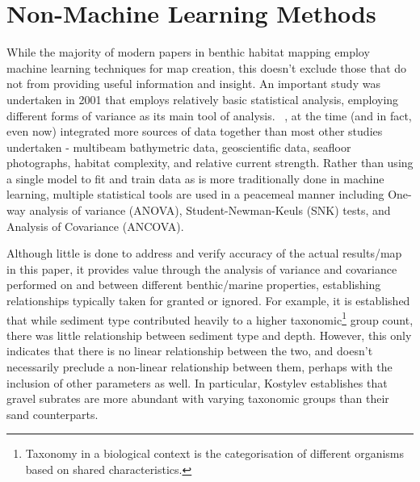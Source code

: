 \section{Non-Machine Learning Methods}
 While the majority of modern papers in benthic habitat mapping employ machine learning techniques for map creation, this doesn't exclude those that do not from providing useful information and insight. An important study was undertaken in 2001 that employs relatively basic statistical analysis, employing different forms of variance as its main tool of analysis. ~\citep{kostylev01}, at the time (and in fact, even now) integrated more sources of data together than most other studies undertaken - multibeam bathymetric data, geoscientific data, seafloor photographs, habitat complexity, and relative current strength. Rather than using a single model to fit and train data as is more traditionally done in machine learning, multiple statistical tools are used in a peacemeal manner including One-way analysis of variance (ANOVA), Student-Newman-Keuls (SNK) tests, and Analysis of Covariance (ANCOVA). 

Although little is done to address and verify accuracy of the actual results/map in this paper, it provides value through the analysis of variance and covariance performed on and between different benthic/marine properties, establishing relationships typically taken for granted or ignored. For example, it is established that while sediment type contributed heavily to a higher taxonomic\footnote{Taxonomy in a biological context is the categorisation of different organisms based on shared characteristics.} group count, there was little relationship between sediment type and depth. However, this only indicates that there is no linear relationship between the two, and doesn't necessarily preclude a non-linear relationship between them, perhaps with the inclusion of other parameters as well. In particular, Kostylev establishes that gravel subrates are more abundant with varying taxonomic groups than their sand counterparts.


